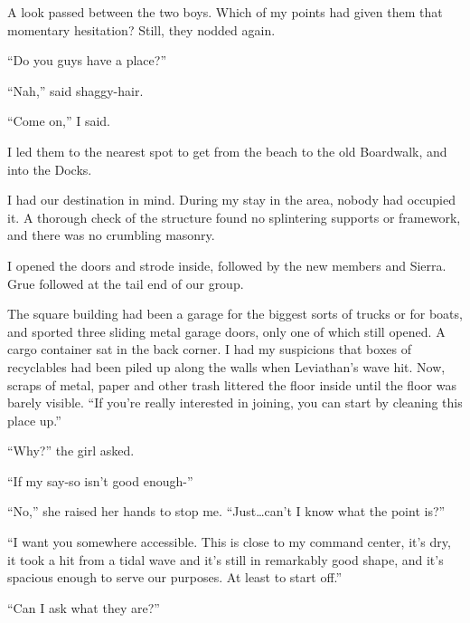A look passed between the two boys.  Which of my points had given them that momentary hesitation?  Still, they nodded again.



``Do you guys have a place?''



``Nah,'' said shaggy-hair.



``Come on,'' I said.



I led them to the nearest spot to get from the beach to the old Boardwalk, and into the Docks.



I had our destination in mind.  During my stay in the area, nobody had occupied it.  A thorough check of the structure found no splintering supports or framework, and there was no crumbling masonry.



I opened the doors and strode inside, followed by the new members and Sierra.  Grue followed at the tail end of our group.



The square building had been a garage for the biggest sorts of trucks or for boats, and sported three sliding metal garage doors, only one of which still opened.  A cargo container sat in the back corner.  I had my suspicions that boxes of recyclables had been piled up along the walls when Leviathan's wave hit.  Now, scraps of metal, paper and other trash littered the floor inside until the floor was barely visible.  ``If you're really interested in joining, you can start by cleaning this place up.''



``Why?'' the girl asked.



``If my say-so isn't good enough-''



``No,'' she raised her hands to stop me.  ``Just\ldots can't I know what the point is?''



``I want you somewhere accessible.  This is close to my command center, it's dry, it took a hit from a tidal wave and it's still in remarkably good shape, and it's spacious enough to serve our purposes.  At least to start off.''



``Can I ask what they are?''



